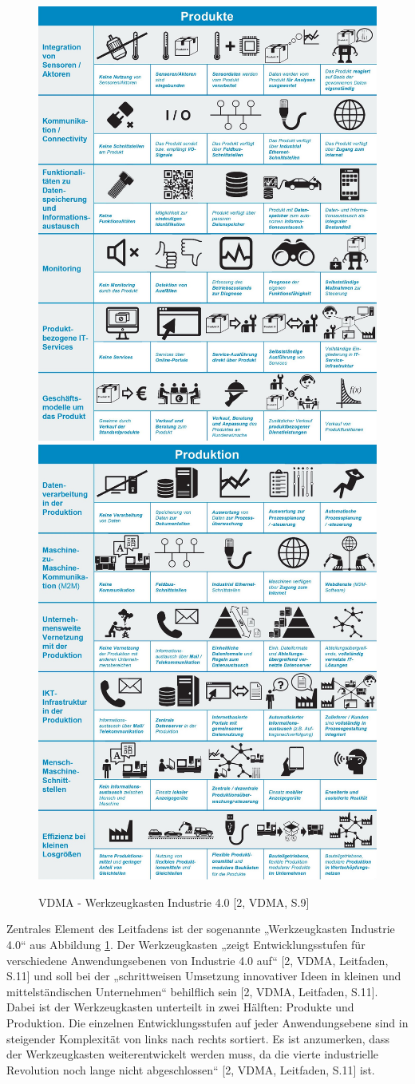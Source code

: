 \begin{figure}[h]
	\centering
	\includegraphics[width=0.45\linewidth]{Bilder/A6_VDMAWerkzeugkasten1}
	\includegraphics[width=0.45\linewidth]{Bilder/A7_VDMAWerkzeugkasten2}
	\caption{VDMA - Werkzeugkasten Industrie 4.0 [2, VDMA, S.9]}
	\label{fig:VDMAWerkzeugkasten}
\end{figure}

Zentrales Element des Leitfadens ist der sogenannte „Werkzeugkasten Industrie 4.0“ aus Abbildung \ref{fig:VDMAWerkzeugkasten}. Der Werkzeugkasten „zeigt Entwicklungsstufen für verschiedene Anwendungsebenen von Industrie 4.0 auf“ [2, VDMA, Leitfaden, S.11] und soll bei der „schrittweisen Umsetzung innovativer Ideen in kleinen und mittelständischen Unternehmen“ behilflich sein [2, VDMA, Leitfaden, S.11]. Dabei ist der Werkzeugkasten unterteilt in zwei Hälften: Produkte und Produktion. Die einzelnen Entwicklungsstufen auf jeder Anwendungsebene sind in steigender Komplexität von links nach rechts sortiert. Es ist anzumerken, dass der Werkzeugkasten weiterentwickelt werden muss, da die vierte industrielle Revolution noch lange nicht abgeschlossen“ [2, VDMA, Leitfaden, S.11] ist. 


